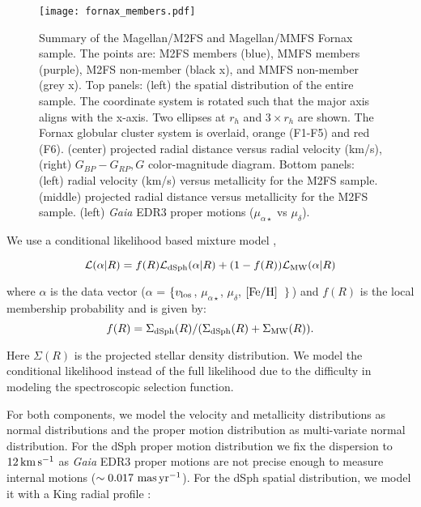 \documentclass[twocolumn]{aastex63}
\begin{document}
\begin{figure*}
\texttt{[image: fornax\_members.pdf]}
\caption{Summary of the Magellan/M2FS and Magellan/MMFS Fornax sample. 
The points are: M2FS members (blue), MMFS members (purple), M2FS non-member (black x), and MMFS non-member (grey x). 
Top panels: (left) the spatial distribution of the entire sample. The coordinate system is rotated such that the major axis aligns with the x-axis.  Two ellipses at $r_h$  and $3\times r_h$ are shown. The Fornax globular cluster system is overlaid, orange (F1-F5) and red (F6).  (center) projected radial distance versus radial velocity (km/s), (right) $ G_{BP} - G_{RP}, G $ color-magnitude diagram.
Bottom panels: 
(left) radial velocity (km/s) versus metallicity for the M2FS sample. 
 (middle) projected radial distance versus metallicity for the M2FS sample.  
(left) {\it Gaia} EDR3 proper motions ($\mu_{\alpha \star}$ vs $\mu_\delta$). 
}
\label{fig:fornax_members}
\end{figure*}

We use a conditional likelihood based mixture model  \citep[e.g.,][]{Martinez2011ApJ...738...55M, Horigome2020MNRAS.499.3320H}, 

\begin{equation}
\mathcal{L}( \alpha| R)  = f(R) \mathcal{L}_{{\rm dSph}}(\alpha|R) + (1-f (R)) \mathcal{L}_{\rm MW} (\alpha|R) \\ 
\end{equation}

\noindent where $\alpha$ is the data vector ($\alpha$ = $\left\{v_{\rm los}\right. $, $\mu_{\alpha \star}$, 
$\mu_{\delta}$, ${\rm [Fe/H] }$ $\left. \right\}$) and $f(R)$ is the local membership probability and is given by: 
\begin{equation}
f(R) = \Sigma_{\rm dSph}(R)/(\Sigma_{\rm dSph}(R) + \Sigma_{\rm MW}(R)). \\ 
\end{equation}

\noindent Here $\Sigma (R)$ is the projected stellar density distribution.
We model the conditional likelihood instead of the full likelihood due to the difficulty in modeling the  spectroscopic selection function. 



For both components, we model the velocity and metallicity distributions as normal distributions and  the proper motion distribution as multi-variate normal distribution.
For the dSph proper motion distribution we fix the dispersion to $12 \mathrm{\,km} \mathrm{\,s}^{-1}$ as {\it Gaia} EDR3 proper motions are not precise enough to measure internal motions ($\sim0.017 \mathrm{\,\mathrm{\,mas} \mathrm{\,yr}^{-1}}$).
For the dSph spatial distribution, we model it with a King radial profile \citep{King1962AJ.....67..471K}:
\end{document}
